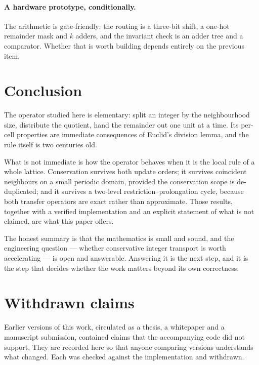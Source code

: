 \documentclass[11pt,a4paper]{article}
\theoremstyle{definition}
\begin{document}
\paragraph{A hardware prototype, conditionally.} The arithmetic is
gate-friendly: the routing is a three-bit shift, a one-hot remainder mask and
$k$ adders, and the invariant check is an adder tree and a comparator. Whether
that is worth building depends entirely on the previous item.

\section{Conclusion}\label{sec:conclusion}

The operator studied here is elementary: split an integer by the neighbourhood
size, distribute the quotient, hand the remainder out one unit at a time. Its
per-cell properties are immediate consequences of Euclid's division lemma, and
the rule itself is two centuries old.

What is not immediate is how the operator behaves when it is the local rule of a
whole lattice. Conservation survives both update orders; it survives
coincident neighbours on a small periodic domain, provided the conservation
scope is de-duplicated; and it survives a two-level restriction--prolongation
cycle, because both transfer operators are exact rather than approximate. Those
results, together with a verified implementation and an explicit statement of
what is not claimed, are what this paper offers.

The honest summary is that the mathematics is small and sound, and the
engineering question --- whether conservative integer transport is worth
accelerating --- is open and answerable. Answering it is the next step, and it
is the step that decides whether the work matters beyond its own correctness.

\appendix

\section{Withdrawn claims}\label{app:withdrawn}

Earlier versions of this work, circulated as a thesis, a whitepaper and a
manuscript submission, contained claims that the accompanying code did not
support. They are recorded here so that anyone comparing versions understands
what changed. Each was checked against the implementation and withdrawn.
\end{document}
